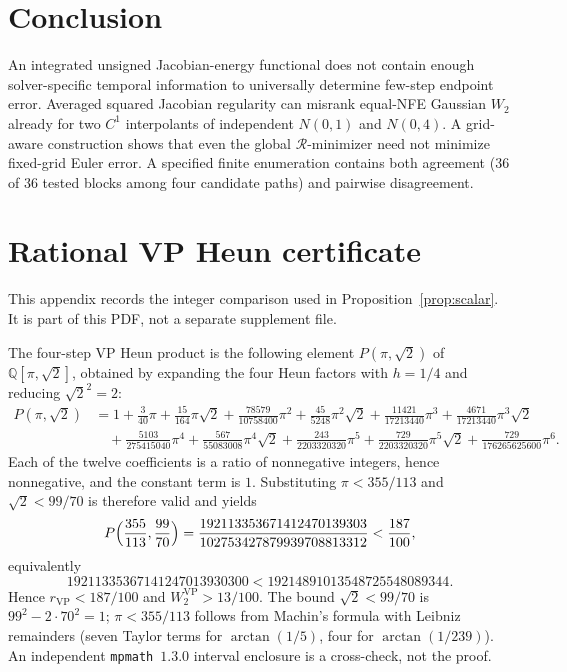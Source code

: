 \documentclass{article}
\newcommand{\wtwo}{W_2}
\newcommand{\cR}{\mathcal{R}}
\begin{document}
\section{Conclusion}
\label{sec:conclusion}

An integrated unsigned Jacobian-energy functional does not contain
enough solver-specific temporal information to universally determine
few-step endpoint error. Averaged squared Jacobian regularity can
misrank equal-NFE Gaussian $\wtwo$ already for two $C^1$ interpolants of
independent $N(0,1)$ and $N(0,4)$. A grid-aware construction shows that
even the global $\cR$-minimizer need not minimize fixed-grid Euler
error. A specified finite enumeration contains both agreement ($36$ of
$36$ tested blocks among four candidate paths) and pairwise
disagreement.

\FloatBarrier



\appendix
\begingroup
\setlength{\abovedisplayskip}{4pt plus 1pt minus 2pt}
\setlength{\belowdisplayskip}{4pt plus 1pt minus 2pt}
\setlength{\abovedisplayshortskip}{2pt plus 1pt}
\setlength{\belowdisplayshortskip}{2pt plus 1pt}
\section{Rational VP Heun certificate}
\label{app:vpheun}

This appendix records the integer comparison used in
Proposition~\ref{prop:scalar}. It is part of this PDF, not a separate
supplement file.

The four-step VP Heun product is the following element $P(\pi,\sqrt{2})$
of $\mathbb{Q}[\pi,\sqrt{2}]$, obtained by expanding the four Heun
factors with $h=1/4$ and reducing $\sqrt{2}^2=2$:
{\small
\begin{equation}
\begin{aligned}
P(\pi,\sqrt{2})
&= 1+\tfrac{3}{40}\pi+\tfrac{15}{164}\pi\sqrt{2}
+\tfrac{78579}{10758400}\pi^2+\tfrac{45}{5248}\pi^2\sqrt{2}
+\tfrac{11421}{17213440}\pi^3
+\tfrac{4671}{17213440}\pi^3\sqrt{2}\\
&\quad+\tfrac{5103}{275415040}\pi^4
+\tfrac{567}{55083008}\pi^4\sqrt{2}
+\tfrac{243}{2203320320}\pi^5
+\tfrac{729}{2203320320}\pi^5\sqrt{2}
+\tfrac{729}{176265625600}\pi^6.
\end{aligned}
\end{equation}
}
Each of the twelve coefficients is a ratio of nonnegative integers,
hence nonnegative, and the constant term is $1$. Substituting
$\pi<355/113$ and $\sqrt{2}<99/70$ is therefore valid and yields
\[
P\Bigl(\frac{355}{113},\frac{99}{70}\Bigr)
=\frac{192113353671412470139303}{102753427879939708813312}
<\frac{187}{100},
\]
equivalently
\[
19211335367141247013930300<19214891013548725548089344.
\]
Hence $r_{\mathrm{VP}}<187/100$ and $W_2^{\mathrm{VP}}>13/100$.
The bound $\sqrt{2}<99/70$ is $99^2-2\cdot 70^2=1$;
$\pi<355/113$ follows from Machin's formula with Leibniz remainders
(seven Taylor terms for $\arctan(1/5)$, four for $\arctan(1/239)$).
An independent \texttt{mpmath}~$1.3.0$ interval enclosure is a
\mbox{cross-check}, not the proof.
\endgroup
\end{document}
